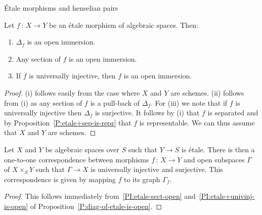 \documentclass[a4paper,twoside,11pt]{amsart}[2009/07/02] %
\newcommand{\pref}[1]{\eqref{#1}}
\newcommand{\map}[3]{#1\,:\, #2\rightarrow #3}
\newcommand{\etale}{\'{e}tale}
\newcommand{\Etale}{\'{E}tale}
\begin{document}
\begin{section}{\Etale{} morphisms and henselian pairs}
\begin{proposition}\label{P:diag-of-etale-is-open}
Let $\map{f}{X}{Y}$ be an \etale{} morphism of algebraic spaces. Then:
\begin{enumerate}
\item $\Delta_f$ is an open immersion.
\item Any section of $f$ is an open immersion.\label{PI:etale-sect-open}
\item If $f$ is universally injective, then $f$ is an open immersion.
\label{PI:etale+univinj-is-open}
\end{enumerate}
\end{proposition}
\begin{proof}
(i) follows easily from the case where $X$ and $Y$ are schemes.
(ii) follows from (i) as any section of $f$ is a pull-back of $\Delta_f$.  For
(iii) we note that if $f$ is universally injective then $\Delta_f$ is
surjective. It follows by (i) that $f$ is separated and by
Proposition~\pref{P:etale+sep-is-repr} that $f$ is representable. We can thus
assume that $X$ and $Y$ are schemes.
\end{proof}

\begin{corollary}\label{C:WWW}
Let $X$ and $Y$ be algebraic spaces over $S$ such that $Y\to S$ is \etale{}.
There is then a one-to-one correspondence between morphisms $\map{f}{X}{Y}$
and open subspaces $\Gamma$ of $X\times_S Y$ such that $\Gamma\to X$ is
universally injective and surjective. This correspondence is given by mapping
$f$ to its graph $\Gamma_f$.
\end{corollary}
\begin{proof}
This follows immediately from~\ref{PI:etale-sect-open}
and~\ref{PI:etale+univinj-is-open} of
Proposition~\pref{P:diag-of-etale-is-open}.
\end{proof}


\end{section}
\end{document}
